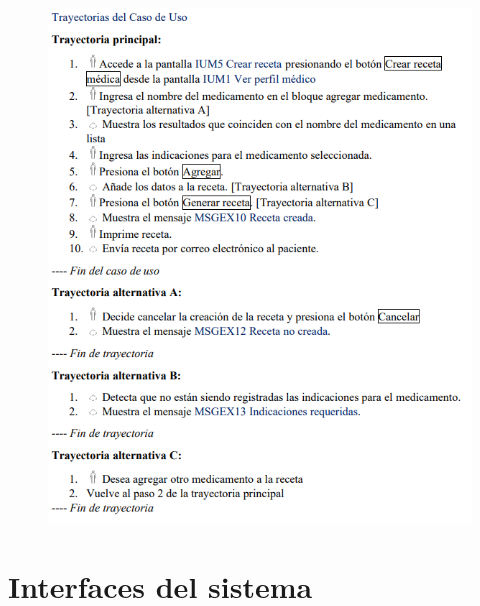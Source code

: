 \documentclass[12pt,letterpaper]{article}
\begin{document}
            \begin{figure}[H]
                \centering
                \includegraphics [scale=0.9]{specs/trayAgregarReceta}
            \end{figure}


    \newpage
    \section{Interfaces del sistema}
\end{document}
